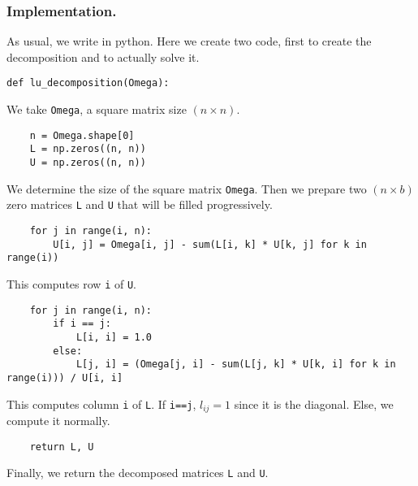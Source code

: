 \documentclass[../../../main.tex]{subfiles}
\begin{document}
\subsubsection{Implementation.} 
As usual, we write in python. 
Here we create two code, first to create the decomposition and to actually solve it.
\begin{verbatim}
def lu_decomposition(Omega):
\end{verbatim}
We take \verb|Omega|, a square matrix size $(n \times n)$.
\begin{verbatim}
    n = Omega.shape[0]
    L = np.zeros((n, n))
    U = np.zeros((n, n))
\end{verbatim}
We determine the size of the square matrix \verb|Omega|. 
Then we prepare two $(n \times  b)$ zero matrices \verb|L| and \verb|U| that will be filled progressively.
\begin{verbatim}
    for j in range(i, n):
        U[i, j] = Omega[i, j] - sum(L[i, k] * U[k, j] for k in range(i))
\end{verbatim}
This computes row \verb|i| of \verb|U|.
\begin{verbatim}
    for j in range(i, n):
        if i == j:
            L[i, i] = 1.0
        else:
            L[j, i] = (Omega[j, i] - sum(L[j, k] * U[k, i] for k in range(i))) / U[i, i]
\end{verbatim}
This computes column \verb|i| of \verb|L|.
If \verb|i==j|, $l_{ij}=1$ since it is the diagonal.
Else, we compute it normally.
\begin{verbatim}
    return L, U
\end{verbatim}
Finally, we return the decomposed matrices \verb|L| and \verb|U|.
\end{document}

